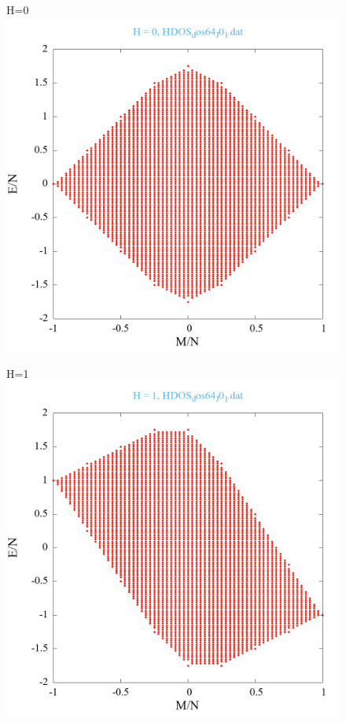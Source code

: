 \documentclass[utf8, babel, sor, jor, amsmath, amssymb, reprint]{elsarticle} %
\begin{document}
\begin{figure}[H]
	\begin{minipage}[h]{0.45\linewidth}
		\centering H=0
		\includegraphics[width=1\linewidth]{HDOS_dos64_J0_1.dat_H0.png}
	\end{minipage}
	\hfill
	\begin{minipage}[h]{0.45\linewidth}
		\centering H=1
		\includegraphics[width=1\linewidth]{HDOS_dos64_J0_1.dat_H1.png}

\end{minipage}
\end{figure}
\end{document}
